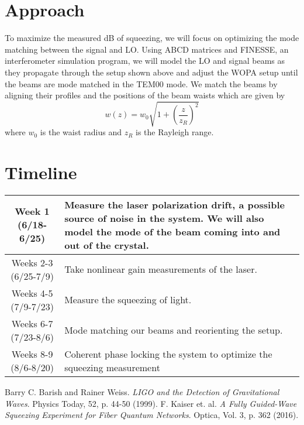 \documentclass[colorlinks=true,pdfstartview=FitV,linkcolor=blue,
citecolor=red,urlcolor=magenta]{ligodoc}
\begin{document}
\section{Approach}
To maximize the measured dB of squeezing, we will focus on optimizing the mode matching between the signal and LO. Using ABCD matrices and FINESSE, an interferometer simulation program, we will model the LO and signal beams as they propagate through the setup shown above and adjust the WOPA setup until the beams are mode matched in the TEM00 mode. We match the beams by aligning their profiles and the positions of the beam waists which are given by
$$w(z)=w_0\sqrt{1+\left(\frac{z}{z_R}\right)^2}$$
where $w_0$ is the waist radius and $z_R$ is the Rayleigh range. 
\section{Timeline}
\begin{center}
\begin{tabular}{|c|m{13cm}|}
    \hline
    Week 1 (6/18-6/25) & Measure the laser polarization drift, a possible source of noise in the system. We will also model the mode of the beam coming into and out of the crystal.\\
   \hline
    Weeks 2-3 (6/25-7/9) & Take nonlinear gain measurements of the laser.\\
    \hline
    Weeks 4-5 (7/9-7/23) & Measure the squeezing of light. \\
    \hline
    Weeks 6-7 (7/23-8/6) & Mode matching our beams and reorienting the setup.\\
    \hline
    Weeks 8-9 (8/6-8/20) & Coherent phase locking the system to optimize the squeezing measurement\\
    \hline
\end{tabular}
\end{center}    
\begin{thebibliography}{9}
 Barry C. Barish and Rainer Weiss. \emph{LIGO and the Detection of Gravitational Waves}. Physics Today, 52, p. 44-50 (1999).
 F. Kaiser et. al. \emph{A Fully Guided-Wave Squeezing Experiment for Fiber Quantum Networks}. Optica, Vol. 3, p. 362 (2016).

\end{thebibliography}
\end{document}
